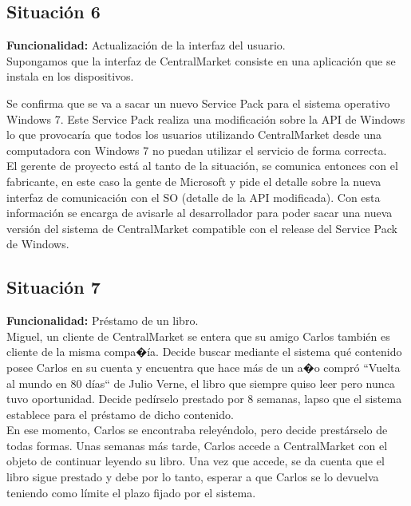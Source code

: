 \documentclass[11pt, a4paper, spanish]{article}
\begin{document}
\subsection{Situaci\'on 6}

	\textbf{Funcionalidad:} Actualizaci\'on de la interfaz del usuario.\\

	Supongamos que la interfaz de CentralMarket consiste en una aplicaci\'on que se instala en los dispositivos.

	Se confirma que se va a sacar un nuevo Service Pack para el sistema operativo Windows 7. Este Service Pack realiza una modificaci\'on sobre la   
   API de Windows lo que provocar\'ia que todos los usuarios utilizando CentralMarket desde una computadora con Windows 7 no puedan utilizar el servicio 
   de forma correcta.\\

       El gerente de proyecto est\'a al tanto de la situaci\'on, se comunica entonces con el fabricante, en este caso la gente de Microsoft y pide el    
   detalle sobre la nueva interfaz de comunicaci\'on con el SO (detalle de la API modificada). Con esta informaci\'on se encarga de avisarle al 
   desarrollador para poder sacar una nueva versi\'on del sistema de CentralMarket compatible con el release del Service Pack de Windows.

\subsection{Situaci\'on 7}

	\textbf{Funcionalidad:} Pr\'estamo de un libro.\\

	Miguel, un cliente de CentralMarket se entera que su amigo Carlos tambi\'en es cliente de la misma compa�\'ia. Decide buscar mediante el sistema    
   qu\'e contenido posee Carlos en su cuenta y encuentra que hace m\'as de un a�o compr\'o ``Vuelta al mundo en 80 d\'ias`` de Julio Verne, el libro que siempre quiso leer pero nunca tuvo oportunidad. Decide ped\'irselo prestado por 8 semanas, lapso que el sistema establece para el pr\'estamo de dicho contenido. \\

        En ese momento, Carlos se encontraba reley\'endolo, pero decide prest\'arselo de todas formas. Unas semanas m\'as tarde, Carlos accede a  CentralMarket con el objeto de continuar leyendo su libro. Una vez que accede, se da cuenta que el libro sigue prestado y debe por lo tanto, esperar a que Carlos se lo devuelva teniendo como l\'imite el plazo fijado por el sistema. 
\end{document}
